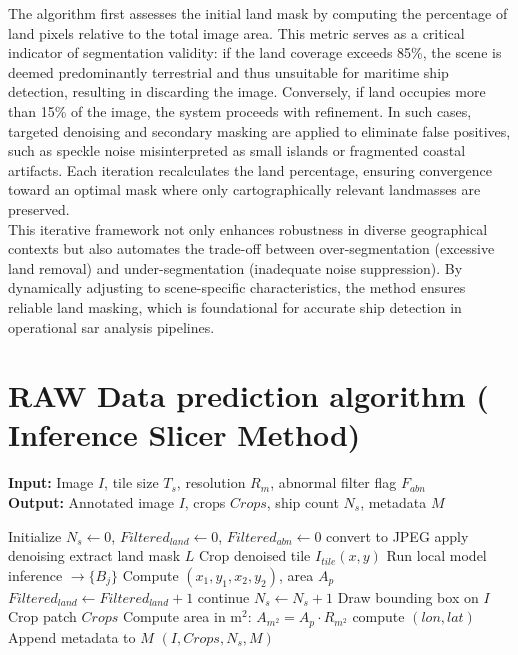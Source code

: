 \documentclass{article}
\begin{document}
	The algorithm first assesses the initial land mask by computing the percentage of land pixels relative to the total image area. This metric serves as a critical indicator of segmentation validity: if the land coverage exceeds 85\%, the scene is deemed predominantly terrestrial and thus unsuitable for maritime ship detection, resulting in discarding the image. Conversely, if land occupies more than 15\% of the image, the system proceeds with refinement. In such cases, targeted denoising and secondary masking are applied to eliminate false positives, such as speckle noise misinterpreted as small islands or fragmented coastal artifacts. Each iteration recalculates the land percentage, ensuring convergence toward an optimal mask where only cartographically relevant landmasses are preserved.\\
	
	This iterative framework not only enhances robustness in diverse geographical contexts but also automates the trade-off between over-segmentation (excessive land removal) and under-segmentation (inadequate noise suppression). By dynamically adjusting to scene-specific characteristics, the method ensures reliable land masking, which is foundational for accurate ship detection in operational \acrshort{sar} analysis pipelines. 
	\newpage
	\section{RAW Data prediction algorithm ( Inference Slicer Method)} \label{appendix:raw}
	\begin{algorithm}[H]
		\caption{Cropped Inference with Filtering}
		\textbf{Input:} Image $I$, tile size $T_s$, resolution $R_m$, abnormal filter flag $F_{abn}$ \\
		\textbf{Output:} Annotated image $I$, crops $Crops$, ship count $N_s$, metadata $M$
		
		\begin{algorithmic}[1]
			\State Initialize $N_s \gets 0$, $Filtered_{land} \gets 0$, $Filtered_{abn} \gets 0$
			\State convert to JPEG
			\State apply denoising
			\State extract land mask $L$
			\EndIf
			\State Crop denoised tile $I_{tile}(x, y)$
			\State Run local model inference $\rightarrow \{B_j\}$
			\State Compute $(x_1, y_1, x_2, y_2)$, area $A_p$
			\State $Filtered_{land} \gets Filtered_{land} + 1$
			\State continue
			\EndIf
			\State $N_s \gets N_s + 1$
			\State Draw bounding box on $I$
			\State Crop patch $Crops$
			\State Compute area in m$^2$: $A_{m^2} = A_p \cdot R_{m^2}$
			\State compute $(lon, lat)$
			\State Append metadata to $M$
			\EndIf
			\EndFor
			\EndFor
			\EndFor
			\State \Return $(I, Crops, N_s, M)$
		\end{algorithmic}
	\end{algorithm}
	
\end{document}
